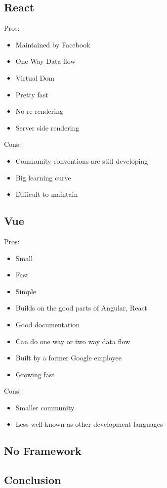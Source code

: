 \documentclass[draftclsnofoot,onecolumn,letterpaper,10pt,compsoc]{IEEEtran}
\begin{document}
	\subsection{React}

    Pros:
    \begin{itemize}
      \item Maintained by Facebook
      \item One Way Data flow
      \item Virtual Dom
      \item Pretty fast
      \item No re-rendering
      \item Server side rendering
    \end{itemize}

    Cons:
    \begin{itemize}
      \item Community conventions are still developing
      \item Big learning curve
      \item Difficult to maintain
    \end{itemize}


  \subsection{Vue}

    Pros:
    \begin{itemize}
      \item Small
      \item Fast
      \item Simple
      \item Builds on the good parts of Angular, React
      \item Good documentation
      \item Can do one way or two way data flow
      \item Built by a former Google employee
      \item Growing fast
    \end{itemize}

    Cons:
    \begin{itemize}
      \item Smaller community
      \item Less well known as other development languages
    \end{itemize}

  \subsection{No Framework}
  \subsection{Conclusion}


{}

\end{document}
